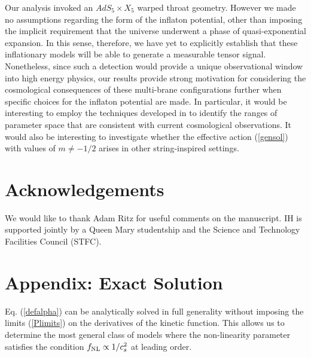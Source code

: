 {Our analysis invoked an $AdS_5 \times X_5$ warped throat geometry. However we 
made no assumptions regarding the form of the inflaton potential, other 
than imposing the implicit requirement that the universe underwent a phase of 
quasi-exponential expansion. In this sense, therefore, we have 
yet to explicitly establish that these inflationary models will 
be able to generate a measurable tensor signal. 
Nonetheless, since such a detection would provide a unique observational 
window into high energy physics, our results 
provide strong motivation for considering the cosmological consequences 
of these multi-brane configurations further when specific choices for the 
inflaton potential are made. In particular, it would be interesting 
to employ the techniques developed in
\cite{bean,Peiris:2007gz,Lorenz:2007ze,Bean:2007eh,Bean:2008ga} 
to identify the ranges of parameter space that are consistent 
with current cosmological observations. It would also be interesting to 
investigate whether the effective action (\ref{gensol}) with values of 
$m \ne - 1/2$ arises in other string-inspired settings. 

\section*{Acknowledgements}
We would like to thank Adam Ritz for useful comments on the manuscript.
IH is supported jointly by a Queen Mary studentship and the Science and
Technology Facilities Council (STFC).

\section*{Appendix: Exact Solution}

Eq. (\ref{defalpha}) can be analytically solved in full 
generality without imposing the limits (\ref{Plimits}) on the 
derivatives of the kinetic function. This allows us to determine the 
most general class of models where the non-linearity parameter 
satisfies the condition $f_{\mathrm{NL}} \propto 1/c_s^2$ at leading order. 

}
